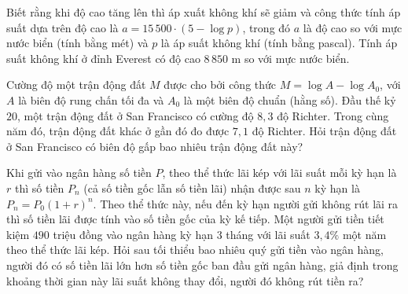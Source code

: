 \begin{bt}%
	Biết rằng khi độ cao tăng lên thì  áp xuất không khí sẽ giảm và công thức tính áp suất dựa trên độ cao là $a=15\,500\cdot\left(5-\log p\right)$, trong đó $a$ là độ cao so với mực nước biển (tính bằng mét) và $p$ là áp suất không khí (tính bằng pascal). Tính áp suất không khí ở đỉnh Everest có độ cao $8\,850$ m so với mực nước biển.
\end{bt}

\begin{ex}%
	Cường độ một trận động đất $M$ được cho bởi công thức $M=\log A-\log A_0$, với $A$ là biên độ rung chấn tối đa và $A_0$ là một  biên độ chuẩn (hằng số). Đầu thế kỷ $20$, một trận động đất ở San Francisco có cường độ $8,3$ độ Richter. Trong cùng năm đó, trận động đất khác ở gần đó đo được $7{,}1$ độ Richter. Hỏi trận động đất ở San Francisco có biên độ gấp bao nhiêu trận động đất này?
\end{ex}

\begin{ex}%
	Khi gửi vào ngân hàng số tiền  $P$, theo thể thức lãi kép với lãi suất mỗi kỳ hạn là $r$ thì số tiền $P_n$ (cả số tiền gốc lẫn số tiền lãi) nhận được sau $n$ kỳ hạn là $P_n=P_0(1+r)^n$. Theo thể thức này, nếu đến kỳ hạn người gửi không rút lãi ra thì số tiền lãi được tính vào số tiền gốc của kỳ kế tiếp. Một người gửi tiền tiết kiệm $490$ triệu đồng vào ngân hàng kỳ hạn $3$ tháng với lãi suất $3,4\%$ một năm theo thể thức lãi kép. Hỏi sau tối thiểu bao nhiêu quý gửi tiền vào ngân hàng, người đó có số tiền lãi lớn hơn số tiền gốc ban đầu gửi ngân hàng, giả định trong khoảng thời gian này lãi suất không thay đổi, người đó không rút tiền ra?
\end{ex}

